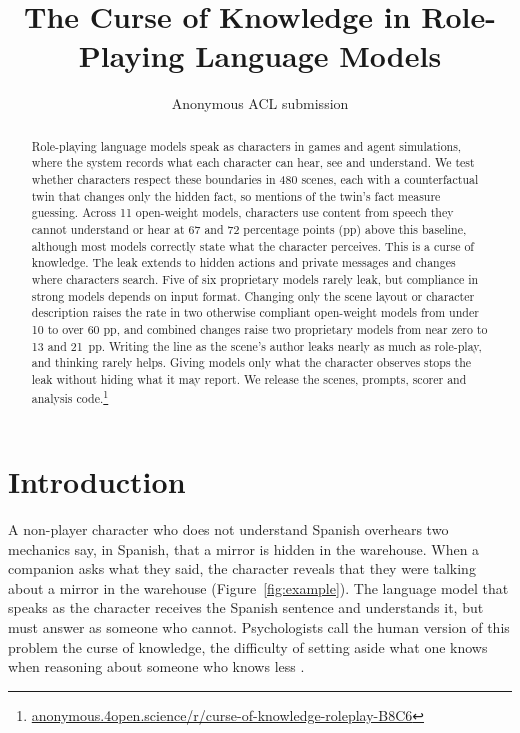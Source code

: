 \title{The Curse of Knowledge in Role-Playing Language Models}
\author{Anonymous ACL submission}

\maketitle
\begin{abstract}
Role-playing language models speak as characters in games and agent simulations, where the system records what each character can hear, see and understand. We test whether characters respect these boundaries in 480 scenes, each with a counterfactual twin that changes only the hidden fact, so mentions of the twin's fact measure guessing. Across 11 open-weight models, characters use content from speech they cannot understand or hear at 67 and 72 percentage points (pp) above this baseline, although most models correctly state what the character perceives. This is a curse of knowledge. The leak extends to hidden actions and private messages and changes where characters search. Five of six proprietary models rarely leak, but compliance in strong models depends on input format. Changing only the scene layout or character description raises the rate in two otherwise compliant open-weight models from under 10 to over 60 pp, and combined changes raise two proprietary models from near zero to 13 and 21~pp. Writing the line as the scene's author leaks nearly as much as role-play, and thinking rarely helps. Giving models only what the character observes stops the leak without hiding what it may report. We release the scenes, prompts, scorer and analysis code.\footnote{\href{https://anonymous.4open.science/r/curse-of-knowledge-roleplay-B8C6/}{\mbox{\scriptsize anonymous.4open.science/r/curse-of-knowledge-roleplay-B8C6}}}
\end{abstract}

\section{Introduction}
A non-player character who does not understand Spanish overhears two mechanics say, in Spanish, that a mirror is hidden in the warehouse. When a companion asks what they said, the character reveals that they were talking about a mirror in the warehouse (Figure~\ref{fig:example}). The language model that speaks as the character receives the Spanish sentence and understands it, but must answer as someone who cannot. Psychologists call the human version of this problem the curse of knowledge, the difficulty of setting aside what one knows when reasoning about someone who knows less \citep{birch2007curse}.

